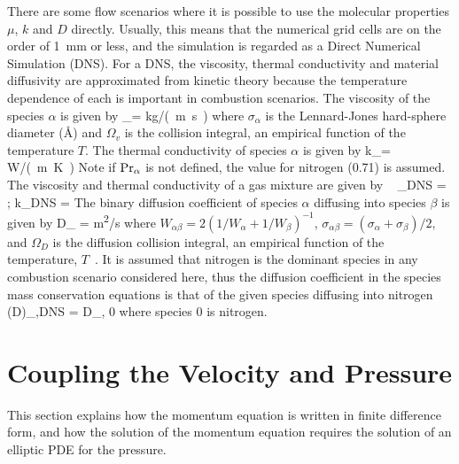 There are some flow scenarios where it is possible to use the molecular properties
$\mu$, $k$ and $D$ directly. Usually, this means that the numerical grid cells are on the
order of 1~mm or less, and the simulation is regarded as a
Direct Numerical Simulation (DNS).
For a DNS, the viscosity, thermal conductivity
and material diffusivity are approximated from kinetic theory because the temperature
dependence of each is important in combustion scenarios.
The viscosity of the species $\alpha$ is given by
\be \mu_\alpha = 
\quad [=] \quad \si{kg/(m.s)} \ee
where $\sigma_\alpha$ is the Lennard-Jones
hard-sphere diameter ($\text{\AA}$) and $\Omega_v$ is the
collision integral, an empirical function of the
temperature $T$. The thermal conductivity of species $\alpha$ is given by
\be k_\alpha =   \quad [=] \quad \si{W/(m.K)} \ee
Note if $\hbox{Pr}_\alpha$ is not defined, the value for nitrogen (0.71) is assumed.
The viscosity and thermal conductivity of a gas mixture are given by  ~\cite{Davidson:1993}
\be \mu_{\hbox{\tiny DNS}} =   \quad ; \quad k_{\hbox{\tiny DNS}} =   \ee
The binary diffusion coefficient of species $\alpha$
diffusing into species $\beta$ is given by
\be D_{\alpha \beta} = 
\quad [=] \quad \si{m^2/s} \ee
where $W_{\alpha \beta}=2(1/W_\alpha+1/W_\beta)^{-1}$, $\sigma_{\alpha \beta}=(\sigma_\alpha+\sigma_\beta)/2$, and
$\Omega_D$ is the diffusion collision integral, an empirical
function of the temperature, $T$~\cite{Poling:1}.
It is assumed that nitrogen is the dominant species in any combustion
scenario considered here, thus the diffusion coefficient in the
species mass conservation equations is that of the given species diffusing
into nitrogen
\be (\rho D)_{\alpha,\hbox{\tiny DNS}} = \rho \;  D_{\alpha, 0} \ee
where species 0 is nitrogen.

\newpage

\section{Coupling the Velocity and Pressure}

This section explains how the momentum equation is written in finite difference form, and how the solution of the momentum equation requires the solution of an elliptic PDE for the pressure.

